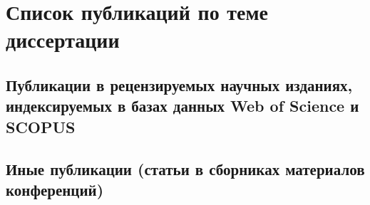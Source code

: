 \documentclass[10pt]{book}
\begin{document}
\chapter{Список публикаций по теме диссертации}

\begin{refsection}
	\nocite{%
		Syromyatnikov:jetp-letters-rus:2014,
		Syromyatnikov:mplb:2016,
		Syromyatnikov:matlet:2016,
		Syromyatnikov:jetp-rus:2017,
		Syromyatnikov:PhysRevB:2018,
		Syromyatnikov:jetp-letters-rus:2018,
		SyromyatnikovJetpl2019rus,
		SyromyatnikovMagLett2019,
		Syromyatnikov2020SurfSci,
		Syro-JMMM-2020}

	\section{Публикации в рецензируемых научных изданиях, индексируемых в базах данных Web of Science и SCOPUS}
	\printbibliography[heading={none},resetnumbers=true]
\end{refsection}

\begin{refsection}
	\nocite{%
		Syromyatnikov:ECOSS30,
		Syromyatnikov:Lomo-rus:2015,
		Syromyatnikov:ECOSS32,
		Syromyatnikov:Lomo-rus:2016,
		Syromyatnikov:CHPH-WI:2017,
		Syromyatnikov:ICNT:2018,
		Syromyatnikov:CHPH-WI:2018,
		Syromyatnikov2019IBCM,
		klavsyuk2019IBCM,
		Klavsyuk2019IWMW,
		Syromyatnikov:CHPH-WI:2020}

	\section{Иные публикации (статьи в сборниках материалов конференций)}
	\printbibliography[heading={none},resetnumbers=true]
\end{refsection}

\vspace*{1.5cm}

\printbibliography
{} %

\vfill\hfill{\tiny \textcolor{black!20!white}{\texttt{\GitDescribe}}}
\end{document}
